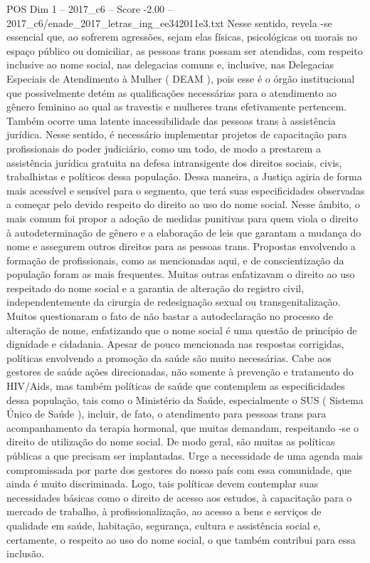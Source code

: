 \begin{textsample}{POS Dim 1 – 2017\_c6 – Score -2.00 – 2017\_c6/enade\_2017\_letras\_ing\_ee342011e3.txt}
Nesse sentido, revela -se essencial que, ao sofrerem agressões, sejam elas físicas, psicológicas ou morais no espaço público ou domiciliar, as pessoas trans possam ser atendidas, com respeito inclusive ao nome social, nas delegacias comuns e, inclusive, nas Delegacias Especiais de Atendimento à Mulher ( DEAM ), pois esse é o órgão institucional que possivelmente detém as qualificações necessárias para o atendimento ao gênero feminino ao qual as travestis e mulheres trans efetivamente pertencem.
Também ocorre uma latente inacessibilidade das pessoas trans à assistência jurídica.
Nesse sentido, é necessário implementar projetos de capacitação para profissionais do poder judiciário, como um todo, de modo a prestarem a assistência jurídica gratuita na defesa intransigente dos direitos sociais, civis, trabalhistas e políticos dessa população.
Dessa maneira, a Justiça agiria de forma mais acessível e sensível para o segmento, que terá suas especificidades observadas a começar pelo devido respeito do direito ao uso do nome social.
Nesse âmbito, o mais comum foi propor a adoção de medidas punitivas para quem viola o direito à autodeterminação de gênero e a elaboração de leis que garantam a mudança do nome e assegurem outros direitos para as pessoas trans.
Propostas envolvendo a formação de profissionais, como as mencionadas aqui, e de conscientização da população foram as mais frequentes.
Muitas outras enfatizavam o direito ao uso respeitado do nome social e a garantia de alteração do registro civil, independentemente da cirurgia de redesignação sexual ou transgenitalização.
Muitos questionaram o fato de não bastar a autodeclaração no processo de alteração de nome, enfatizando que o nome social é uma questão de princípio de dignidade e cidadania.
Apesar de pouco mencionada nas respostas corrigidas, políticas envolvendo a promoção da saúde são muito necessárias.
Cabe aos gestores de saúde ações direcionadas, não somente à prevenção e tratamento do HIV/Aids, mas também políticas de saúde que contemplem as especificidades dessa população, tais como o Ministério da Saúde, especialmente o SUS ( Sistema Único de Saúde ), incluir, de fato, o atendimento para pessoas trans para acompanhamento da terapia hormonal, que muitas demandam, respeitando -se o direito de utilização do nome social.
De modo geral, são muitas as políticas públicas a que precisam ser implantadas.
Urge a necessidade de uma agenda mais compromissada por parte dos gestores do nosso país com essa comunidade, que ainda é muito discriminada.
Logo, tais políticas devem contemplar suas necessidades básicas como o direito de acesso aos estudos, à capacitação para o mercado de trabalho, à profissionalização, ao acesso a bens e serviços de qualidade em saúde, habitação, segurança, cultura e assistência social e, certamente, o respeito ao uso do nome social, o que também contribui para essa inclusão.

\end{textsample}
